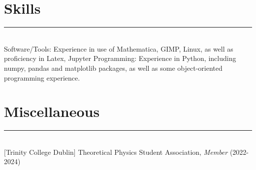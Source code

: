 \documentclass{article}
\begin{document}
\section*{Skills}
\hrule~\\
Software/Tools: Experience in use of Mathematica, GIMP, Linux, as well as proficiency in Latex, Jupyter
Programming: Experience in Python, including numpy, pandas and matplotlib packages, as well as some object-oriented programming experience.
\section*{Miscellaneous}
\hrule~\\
$[$Trinity College Dublin$]$ Theoretical Physics Student Association, \textit{Member} (2022-2024)
\end{document}
